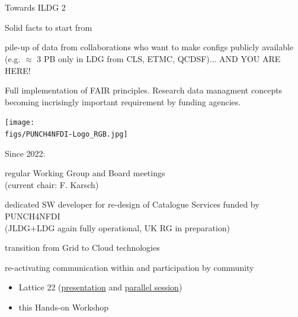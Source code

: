 \documentclass[aspectratio=169,xcolor=dvipsnames]{beamer}
\def\Darrow{\ding{220}}
\newcommand{\bi}{\begin{itemize}}
\newcommand{\ei}{\end{itemize}}
\def\figs{figs1}
\begin{document}
\section{}
\begin{frame}{Towards ILDG 2}

  Solid facts to start from
  \begin{dinglist}{52}
     \item pile-up of data from collaborations who want to make configs publicly available\\
     (e.g. $\approx$ 3 PB only in LDG from CLS, ETMC, QCDSF)... AND YOU ARE HERE!
     \item Full implementation of FAIR principles. Research data managment concepts becoming incrisingly important requirement by funding agencies.

  \end{dinglist}

  \hfill  \texttt{[image: \\figs/PUNCH4NFDI-Logo\_RGB.jpg]}

  \vspace*{-10mm}
  Since 2022:
  \begin{dinglist}{52}
  \item regular Working Group and Board meetings \\
    (current chair: F. Karsch)
  \item dedicated SW developer for re-design of Catalogue Services funded by PUNCH4NFDI\\
    (JLDG+LDG again fully operational, UK RG in preparation)
  \item transition from Grid to Cloud technologies
  \item re-activating communication within and participation by community
    \bi
    \item[\Darrow] Lattice 22 (\href{https://arxiv.org/pdf/2212.08392}{presentation} and
    \href{https://arxiv.org/pdf/2212.10138}{parallel session})
    \item[\Darrow] this Hands-on Workshop
    \ei
  \end{dinglist}
  \vfill
\end{frame}
\end{document}
